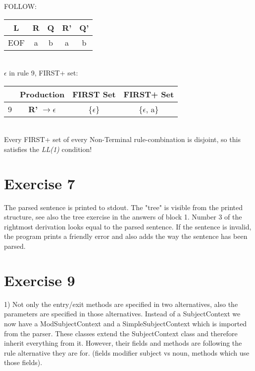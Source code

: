 \documentclass[11pt]{article} %
\begin{document}
\noindent FOLLOW: \\

\begin{tabular}{|c|c|c|c|c|} \hline 
\textbf{L}
& \textbf{R}
& \textbf{Q}
& \textbf{R'}
& \textbf{Q'} \\\hline

EOF
& a
& b
& a
& b \\\hline  
\end{tabular} \\

\noindent $\epsilon$ in rule 9, FIRST+ set: \\

\begin{tabular}{|c|c|c|c|} \hline 
& Production
& FIRST Set
& FIRST+ Set \\\hline

9
& \textbf{R'} $\rightarrow \epsilon$
& \{$\epsilon$\}
& \{$\epsilon$, a\} \\\hline 
\end{tabular}\\

\noindent Every FIRST+ set of every Non-Terminal rule-combination is disjoint, so this satisfies the \textit{LL(1)} condition!


\section*{Exercise 7}
The parsed sentence is printed to stdout. The "tree" is visible from the printed structure, see also the tree exercise in the answers of block 1. Number 3 of the rightmost derivation looks equal to the parsed sentence. If the sentence is invalid, the program prints a friendly error and also adds the way the sentence has been parsed.

\section*{Exercise 9}
1) Not only the entry/exit methods are specified in two alternatives, also the parameters are specified in those alternatives.
Instead of a SubjectContext we now have a ModSubjectContext and a SimpleSubjectContext which is imported from the parser.
These classes extend the SubjectContext class and therefore inherit everything from it. However, their fields and
methods are following the rule alternative they are for. (fields modifier subject vs noun, methods which use those fields).\\
\end{document}
